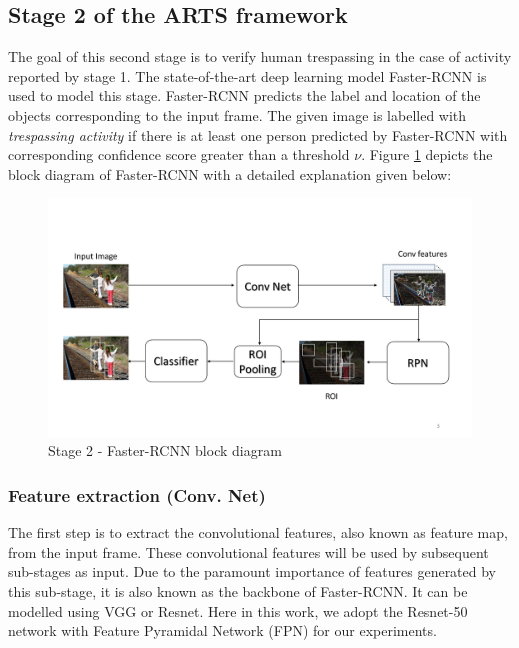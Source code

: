 \subsection{Stage 2 of the ARTS framework}
\label{sec:stage2}
The goal of this second stage is to verify human trespassing in the case of activity reported by stage 1. The state-of-the-art deep learning model Faster-RCNN\cite{ref_fasterrcnn} is used to model this stage. Faster-RCNN predicts the label and location of the objects corresponding to the input frame. The given image is labelled with \textit{trespassing activity} if there is at least one person predicted by Faster-RCNN with corresponding confidence score greater than a threshold $\nu$. Figure \ref{fig:faster-rcnn-pipeline} depicts the block diagram of Faster-RCNN with a detailed explanation given below: 


\begin{figure}
    \centering
    \includegraphics[width=\linewidth,trim={0 80 0 120},clip]{images/faster-rcnn-pipeline}
    \caption{Stage 2 - Faster-RCNN block diagram}
    \label{fig:faster-rcnn-pipeline}
\end{figure}

\vspace{5pt}
\subsubsection{Feature extraction (Conv. Net)}
\label{sec:feature-extraction}
The first step is to extract the convolutional features, also known as feature map, from the input frame. These convolutional features will be used by subsequent sub-stages as input. Due to the paramount importance of features generated by this sub-stage, it is also known as the backbone of Faster-RCNN. It can be modelled using VGG\cite{simonyan2014very} or Resnet\cite{he2016deep}. Here in this work, we adopt the Resnet-50 network with Feature Pyramidal Network (FPN) \cite{lin2017feature} for our experiments. 

